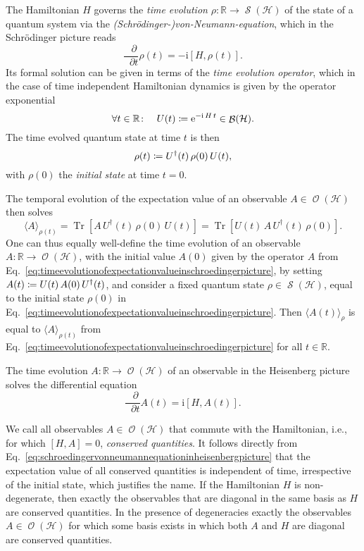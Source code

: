 \documentclass[a4paper,12pt,listof=totoc,index=totoc,bibliography=totoc,headsepline=false,headings=normal,BCOR16.153846mm,DIV12,headinclude,twoside,cleardoublepage=empty,numbers=noenddot,final]{scrreprt}
\theoremstyle{mystyle}
\numberwithin{equation}{section}
\numberwithin{figure}{section}
\numberwithin{lemma}{section}
\numberwithin{theorem}{section}
\numberwithin{corollary}{section}
\numberwithin{definition}{section}
\numberwithin{conjecture}{section}
\numberwithin{observation}{section}
\newcommand{\+}{\mkern2mu}
\newcommand{\coloneqq}{\mathrel{\vcentcolon\mkern-1.2mu=}} %
\newcommand{\texteqref}[1]{Eq.~\eqref{#1}}
\newcommand{\oftype}{\colon}
\newcommand{\itholds}{\colon\mathchoice{\quad}{}{}{}}
\renewcommand{\H}{H}
\newcommand{\ex}[2]{\langle #1 \rangle_{#2}}
\newcommand{\del}{\mathop{}\!\partial}
\newcommand{\e}{\mathrm{e}}
\renewcommand{\i}{\mathrm{i}}
\DeclareMathOperator{\1}{\mathds{1}}
\DeclareMathOperator{\Bop}{\mathcal{B}}
\DeclareMathOperator{\Obs}{\mathcal{O}}
\DeclareMathOperator{\Qst}{\mathcal{S}}
\DeclareMathOperator{\Tr}{Tr}
\newcommand{\mc}[1]{\mathcal{#1}}
\newcommand{\mcH}{\mc{H}}
\newcommand{\mb}[1]{\mathbb{#1}}
\newcommand{\R}{\mb{R}}
\begin{document}
The Hamiltonian $\H$ governs the \emph{time evolution} $\rho \colon \R \to \Qst(\mcH)$ of the state of a quantum system via the \emph{(Schrödinger-)von-Neumann-equation}, which in the Schrödinger picture reads
\begin{equation}
  \frac{\del}{\del t} \rho(t) = - \i [\H,\rho(t)] .
\end{equation}
Its formal solution can be given in terms of the \emph{time evolution operator}, which in the case of time independent Hamiltonian dynamics is given by the operator exponential
\begin{equation} \label{eq:timeevolution}
  \forall t\in\R\itholds U(t) \coloneqq \e^{-\i\,\H\,t} \in \Bop(\mcH) .
\end{equation}
The time evolved quantum state at time $t$ is then
\begin{equation}
  \rho(t) \coloneqq U^\dagger(t)\,\rho(0)\,U(t) ,
\end{equation}
with $\rho(0)$ the \emph{initial state} at time $t=0$.

The temporal evolution of the expectation value of an observable $A \in \Obs(\mcH)$ then solves
\begin{equation} \label{eq:timeevolutionofexpectationvalueinschroedingerpicture}
  \ex{A}{\rho(t)} = \Tr[A\,U^\dagger(t)\,\rho(0)\,U(t)] = \Tr[U(t)\,A\,U^\dagger(t)\,\rho(0)] .
\end{equation}
One can thus equally well-define the time evolution of an observable $A\oftype \R \to \Obs(\mcH)$, with the initial value $A(0)$ given by the operator $A$ from \texteqref{eq:timeevolutionofexpectationvalueinschroedingerpicture}, by setting $A(t) \coloneqq U(t)\,A(0)\,U^\dagger(t)$, and consider a fixed quantum state $\rho \in \Qst(\mcH)$, equal to the initial state $\rho(0)$ in \texteqref{eq:timeevolutionofexpectationvalueinschroedingerpicture}.
Then $\ex{A(t)}{\rho}$ is equal to $\ex{A}{\rho(t)}$ from \texteqref{eq:timeevolutionofexpectationvalueinschroedingerpicture} for all $t \in \R$.

The time evolution $A\oftype \R \to \Obs(\mcH)$ of an observable in the Heisenberg picture solves the differential equation
\begin{equation}\label{eq:schroedingervonneumannequationinheisenbergpicture}
  \frac{\del}{\del t} A(t) = \i [\H,A(t)] .
\end{equation}

We call all observables $A \in \Obs(\mcH)$ that commute with the Hamiltonian, i.e., for which $[\H,A] = 0$, \emph{conserved quantities}.
It follows directly from \texteqref{eq:schroedingervonneumannequationinheisenbergpicture} that the expectation value of all conserved quantities is independent of time, irrespective of the initial state, which justifies the name.
If the Hamiltonian $\H$ is non-degenerate, then exactly the observables that are diagonal in the same basis as $\H$ are conserved quantities.
In the presence of degeneracies exactly the observables $A \in \Obs(\mcH)$ for which some basis exists in which both $A$ and $\H$ are diagonal are conserved quantities.
\end{document}

